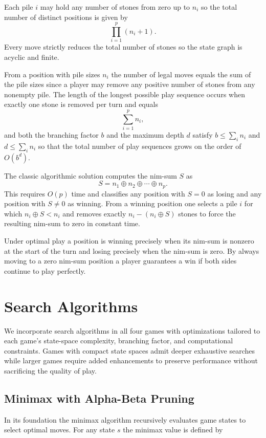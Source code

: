 \documentclass[12pt]{article}
\begin{document}
Each pile \(i\) may hold any number of stones from zero up to \(n_i\) so the total number of distinct positions is given by  
\[
\prod_{i=1}^p (n_i + 1).
\]
Every move strictly reduces the total number of stones so the state graph is acyclic and finite.

From a position with pile sizes \(n_i\) the number of legal moves equals the sum of the pile sizes since a player may remove any positive number of stones from any nonempty pile. The length of the longest possible play sequence occurs when exactly one stone is removed per turn and equals  
\[
\sum_{i=1}^p n_i,
\]
and both the branching factor \(b\) and the maximum depth \(d\) satisfy \(b \le \sum_i n_i\) and \(d \le \sum_i n_i\) so that the total number of play sequences grows on the order of \(O(b^d)\).

The classic algorithmic solution computes the nim-sum \(S\) as  
\[
S = n_1 \oplus n_2 \oplus \cdots \oplus n_p.
\]
This requires \(O(p)\) time and classifies any position with \(S = 0\) as losing and any position with \(S \neq 0\) as winning. From a winning position one selects a pile \(i\) for which \(n_i \oplus S < n_i\) and removes exactly \(n_i - (n_i \oplus S)\) stones to force the resulting nim-sum to zero in constant time.

Under optimal play a position is winning precisely when its nim-sum is nonzero at the start of the turn and losing precisely when the nim-sum is zero. By always moving to a zero nim-sum position a player guarantees a win if both sides continue to play perfectly.

\section{Search Algorithms}

We incorporate search algorithms in all four games with optimizations tailored to each game’s state-space complexity, branching factor, and computational constraints. Games with compact state spaces admit deeper exhaustive searches while larger games require added enhancements to preserve performance without sacrificing the quality of play.

\subsection{Minimax with Alpha-Beta Pruning}

In its foundation the minimax algorithm recursively evaluates game states to select optimal moves. For any state \(s\) the minimax value is defined by
\end{document}
